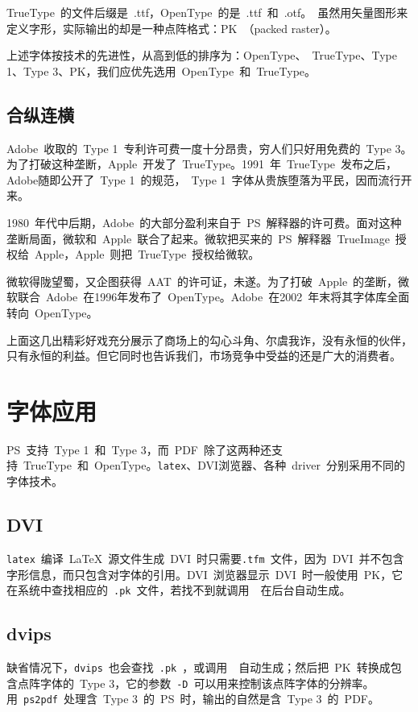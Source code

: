 TrueType~的文件后缀是~.ttf，OpenType~的是~.ttf~和~.otf。\MF~虽然用矢量图形来定义字形，实际输出的却是一种点阵格式：PK~（packed raster）。

上述字体按技术的先进性，从高到低的排序为：OpenType、~TrueType、Type 1、Type 3、PK，我们应优先选用~OpenType~和~TrueType。

\subsection{合纵连横}
Adobe~收取的~Type 1~专利许可费一度十分昂贵，穷人们只好用免费的~Type 3。为了打破这种垄断，Apple~开发了~TrueType。1991~年~TrueType~发布之后，Adobe随即公开了~Type 1~的规范，~Type 1~字体从贵族堕落为平民，因而流行开来。

1980~年代中后期，Adobe~的大部分盈利来自于~PS~解释器的许可费。面对这种垄断局面，微软和~Apple~联合了起来。微软把买来的~PS~解释器~TrueImage~授权给~Apple，Apple~则把~TrueType~授权给微软。

微软得陇望蜀，又企图获得~AAT~的许可证，未遂。为了打破~Apple~的垄断，微软联合~Adobe~在1996年发布了~OpenType。Adobe~在2002~年末将其字体库全面转向~OpenType。

上面这几出精彩好戏充分展示了商场上的勾心斗角、尔虞我诈，没有永恒的伙伴，只有永恒的利益。但它同时也告诉我们，市场竞争中受益的还是广大的消费者。

\section{字体应用}

PS~支持~Type 1~和~Type 3，而~PDF~除了这两种还支持~TrueType~和~OpenType。\verb|latex|、DVI浏览器、各种~driver~分别采用不同的字体技术。

\subsection{DVI}
\verb|latex|~编译~\LaTeX~源文件生成~DVI~时只需要\verb|.tfm|~文件，因为~DVI~并不包含字形信息，而只包含对字体的引用。DVI~浏览器显示~DVI~时一般使用~PK，它在系统中查找相应的~\verb|.pk|~文件，若找不到就调用~\MF~在后台自动生成。

\subsection{dvips}
缺省情况下，\verb|dvips|~也会查找~\verb|.pk|~，或调用~\MF~自动生成；然后把~PK~转换成包含点阵字体的~Type 3，它的参数~\verb|-D|~可以用来控制该点阵字体的分辨率。用~\verb|ps2pdf|~处理含~Type 3~的~PS~时，输出的自然是含~Type 3~的~PDF。

